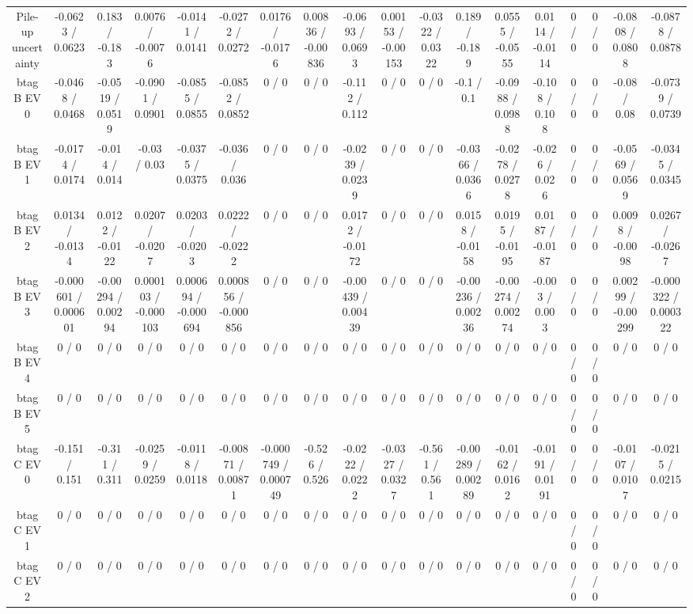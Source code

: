 \documentclass[10pt]{article}
\begin{document}
\begin{table}[htbp]
\begin{center}
\begin{tabular}{|c|c|c|c|c|c|c|c|c|c|c|c|c|c|c|c|c|c|}
  Pile-up uncertainty & -0.0623 / 0.0623 & 0.183 / -0.183 & 0.0076 / -0.0076 & -0.0141 / 0.0141 & -0.0272 / 0.0272 & 0.0176 / -0.0176 & 0.00836 / -0.00836 & -0.0693 / 0.0693 & 0.00153 / -0.00153 & -0.0322 / 0.0322 & 0.189 / -0.189 & 0.0555 / -0.0555 & 0.0114 / -0.0114 & 0 / 0 & 0 / 0 & -0.0808 / 0.0808 & -0.0878 / 0.0878 \\ 
  btag B EV 0 & -0.0468 / 0.0468 & -0.0519 / 0.0519 & -0.0901 / 0.0901 & -0.0855 / 0.0855 & -0.0852 / 0.0852 & 0 / 0 & 0 / 0 & -0.112 / 0.112 & 0 / 0 & 0 / 0 & -0.1 / 0.1 & -0.0988 / 0.0988 & -0.108 / 0.108 & 0 / 0 & 0 / 0 & -0.08 / 0.08 & -0.0739 / 0.0739 \\ 
  btag B EV 1 & -0.0174 / 0.0174 & -0.014 / 0.014 & -0.03 / 0.03 & -0.0375 / 0.0375 & -0.036 / 0.036 & 0 / 0 & 0 / 0 & -0.0239 / 0.0239 & 0 / 0 & 0 / 0 & -0.0366 / 0.0366 & -0.0278 / 0.0278 & -0.026 / 0.026 & 0 / 0 & 0 / 0 & -0.0569 / 0.0569 & -0.0345 / 0.0345 \\ 
  btag B EV 2 & 0.0134 / -0.0134 & 0.0122 / -0.0122 & 0.0207 / -0.0207 & 0.0203 / -0.0203 & 0.0222 / -0.0222 & 0 / 0 & 0 / 0 & 0.0172 / -0.0172 & 0 / 0 & 0 / 0 & 0.0158 / -0.0158 & 0.0195 / -0.0195 & 0.0187 / -0.0187 & 0 / 0 & 0 / 0 & 0.0098 / -0.0098 & 0.0267 / -0.0267 \\ 
  btag B EV 3 & -0.000601 / 0.000601 & -0.00294 / 0.00294 & 0.000103 / -0.000103 & 0.000694 / -0.000694 & 0.000856 / -0.000856 & 0 / 0 & 0 / 0 & -0.00439 / 0.00439 & 0 / 0 & 0 / 0 & -0.00236 / 0.00236 & -0.00274 / 0.00274 & -0.003 / 0.003 & 0 / 0 & 0 / 0 & 0.00299 / -0.00299 & -0.000322 / 0.000322 \\ 
  btag B EV 4 & 0 / 0 & 0 / 0 & 0 / 0 & 0 / 0 & 0 / 0 & 0 / 0 & 0 / 0 & 0 / 0 & 0 / 0 & 0 / 0 & 0 / 0 & 0 / 0 & 0 / 0 & 0 / 0 & 0 / 0 & 0 / 0 & 0 / 0 \\ 
  btag B EV 5 & 0 / 0 & 0 / 0 & 0 / 0 & 0 / 0 & 0 / 0 & 0 / 0 & 0 / 0 & 0 / 0 & 0 / 0 & 0 / 0 & 0 / 0 & 0 / 0 & 0 / 0 & 0 / 0 & 0 / 0 & 0 / 0 & 0 / 0 \\ 
  btag C EV 0 & -0.151 / 0.151 & -0.311 / 0.311 & -0.0259 / 0.0259 & -0.0118 / 0.0118 & -0.00871 / 0.00871 & -0.000749 / 0.000749 & -0.526 / 0.526 & -0.0222 / 0.0222 & -0.0327 / 0.0327 & -0.561 / 0.561 & -0.00289 / 0.00289 & -0.0162 / 0.0162 & -0.0191 / 0.0191 & 0 / 0 & 0 / 0 & -0.0107 / 0.0107 & -0.0215 / 0.0215 \\ 
  btag C EV 1 & 0 / 0 & 0 / 0 & 0 / 0 & 0 / 0 & 0 / 0 & 0 / 0 & 0 / 0 & 0 / 0 & 0 / 0 & 0 / 0 & 0 / 0 & 0 / 0 & 0 / 0 & 0 / 0 & 0 / 0 & 0 / 0 & 0 / 0 \\ 
  btag C EV 2 & 0 / 0 & 0 / 0 & 0 / 0 & 0 / 0 & 0 / 0 & 0 / 0 & 0 / 0 & 0 / 0 & 0 / 0 & 0 / 0 & 0 / 0 & 0 / 0 & 0 / 0 & 0 / 0 & 0 / 0 & 0 / 0 & 0 / 0 \\ 

\end{tabular}
\end{center}
\end{table}
\end{document}
